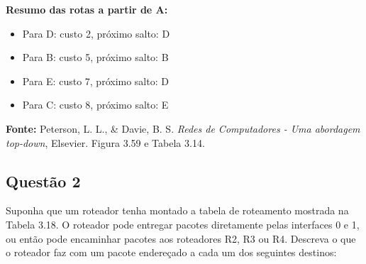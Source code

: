 \begin{table}[h!]
\centering
{}
\caption{Etapas do algoritmo de busca direta (Dijkstra) para o nó A.}
\end{table}


\vspace{0.5cm}
\textbf{Resumo das rotas a partir de A:}

\begin{itemize}
    \item Para D: custo 2, próximo salto: D
    \item Para B: custo 5, próximo salto: B
    \item Para E: custo 7, próximo salto: D
    \item Para C: custo 8, próximo salto: E
\end{itemize}

\vspace{0.5cm}
\textbf{Fonte:} Peterson, L. L., \& Davie, B. S. \textit{Redes de Computadores - Uma abordagem top-down}, Elsevier. Figura 3.59 e Tabela 3.14.

\subsection{Questão 2}
Suponha que um roteador tenha montado a tabela de roteamento mostrada na Tabela 3.18. O
roteador pode entregar pacotes diretamente pelas interfaces 0 e 1, ou então pode encaminhar
pacotes aos roteadores R2, R3 ou R4. Descreva o que o roteador faz com um pacote endereçado a
cada um dos seguintes destinos:

